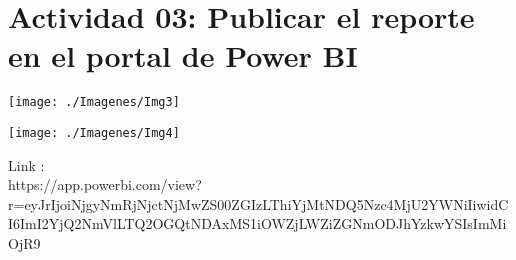 \section{Actividad 03: Publicar el reporte en el portal de Power BI} 

	\begin{center}
	\texttt{[image: ./Imagenes/Img3]}
	\end{center}	


	\begin{center}
	\texttt{[image: ./Imagenes/Img4]}
	\end{center}	
Link : \\
https://app.powerbi.com/view?r=eyJrIjoiNjgyNmRjNjctNjMwZS00ZGIzLThiYjMtNDQ5Nzc4MjU2YWNiIiwidCI6ImI2YjQ2NmVlLTQ2OGQtNDAxMS1iOWZjLWZiZGNmODJhYzkwYSIsImMiOjR9